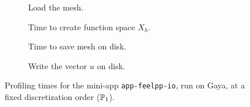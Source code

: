\begin{figure}
  \begin{subfigure}[c]{0.49\textwidth}
    \centering
    \plot{\dataLoadMesh}
    \caption{ Load the mesh. }
  \end{subfigure}
  \begin{subfigure}[c]{0.49\textwidth}
    \centering
    \plot{\dataFunctionSpace}
    \caption{ Time to create function space $X_h$. }
  \end{subfigure}
  \begin{subfigure}[c]{0.49\textwidth}
    \centering
    \plot[(0.99,0.35)]{\dataSaveMesh}
    \caption{ Time to save mesh on disk. }
  \end{subfigure}
  \begin{subfigure}[c]{0.49\textwidth}
    \centering
    \plot[(0.99,0.35)]{\dataExportData}
    \caption{ Write  the vector $u$ on disk. }
  \end{subfigure}
  \caption{Profiling times for the mini-app \texttt{app-feelpp-io}, run on Gaya, at a fixed discretization order ($\mathbb{P}_1$).}
\end{figure}

